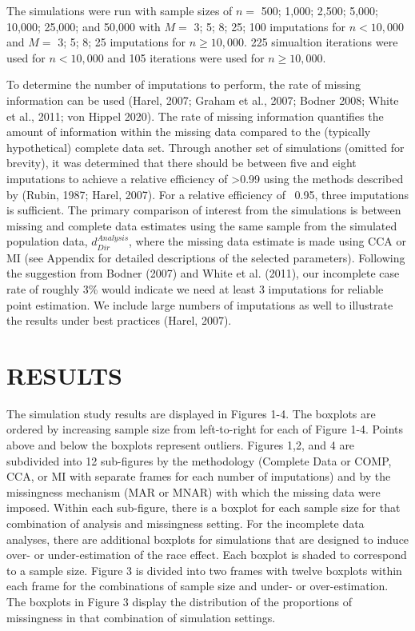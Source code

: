 \documentclass[titlepage]{article}
\begin{document}
The simulations were run with sample sizes of \(n = \) 500; 1,000; 2,500; 5,000; 10,000; 25,000; and 50,000 with \(M = \) 3; 5; 8; 25; 100 imputations for \(n < 10,000\) and \(M = \) 3; 5; 8; 25 imputations for \(n \geq 10,000\). 225 simualtion iterations were used for \(n < 10,000\) and 105 iterations were used for \(n \geq 10,000\).

To determine the number of imputations to perform, the rate of missing information can be used (Harel, 2007; Graham et al., 2007; Bodner 2008; White et al., 2011; von Hippel 2020). The rate of missing information quantifies the amount of information within the missing data compared to the (typically hypothetical) complete data set. Through another set of simulations (omitted for brevity), it was determined that there should be between five and eight imputations to achieve a relative efficiency of >0.99 using the methods described by (Rubin, 1987; Harel, 2007). For a relative efficiency of ~0.95, three imputations is sufficient. The primary comparison of interest from the simulations is between missing and complete data estimates using the same sample from the simulated population data, $d_{Dir}^{Analysis}$, where the missing data estimate is made using CCA or MI (see Appendix for detailed descriptions of the selected parameters). Following the suggestion from Bodner (2007) and White et al. (2011), our incomplete case rate of roughly 3\% would indicate we need at least 3 imputations for reliable point estimation. We include large numbers of imputations as well to illustrate the results under best practices (Harel, 2007). 

\section{RESULTS}

The simulation study results are displayed in Figures 1-4. The boxplots are ordered by increasing sample size from left-to-right for each of Figure 1-4. Points above and below the boxplots represent outliers. Figures 1,2, and 4 are subdivided into 12 sub-figures by the methodology (Complete Data or COMP, CCA, or MI with separate frames for each number of imputations) and by the missingness mechanism (MAR or MNAR) with which the missing data were imposed. Within each sub-figure, there is a boxplot for each sample size for that combination of analysis and missingness setting. For the incomplete data analyses, there are additional boxplots for simulations that are designed to induce over- or under-estimation of the race effect. Each boxplot is shaded to correspond to a sample size. Figure 3 is divided into two frames with twelve boxplots within each frame for the combinations of sample size and under- or over-estimation. The boxplots in Figure 3 display the distribution of the proportions of missingness in that combination of simulation settings.
\end{document}
